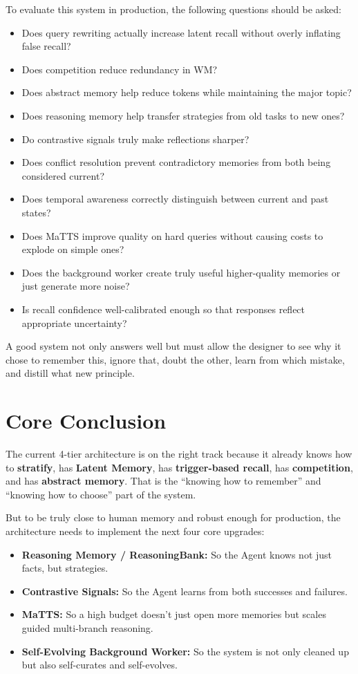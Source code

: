 \documentclass[a4paper,12pt]{article}
\begin{document}
To evaluate this system in production, the following questions should be asked:
\begin{itemize}
    \item Does query rewriting actually increase latent recall without overly inflating false recall?
    \item Does competition reduce redundancy in WM?
    \item Does abstract memory help reduce tokens while maintaining the major topic?
    \item Does reasoning memory help transfer strategies from old tasks to new ones?
    \item Do contrastive signals truly make reflections sharper?
    \item Does conflict resolution prevent contradictory memories from both being considered current?
    \item Does temporal awareness correctly distinguish between current and past states?
    \item Does MaTTS improve quality on hard queries without causing costs to explode on simple ones?
    \item Does the background worker create truly useful higher-quality memories or just generate more noise?
    \item Is recall confidence well-calibrated enough so that responses reflect appropriate uncertainty?
\end{itemize}

A good system not only answers well but must allow the designer to see why it chose to remember this, ignore that, doubt the other, learn from which mistake, and distill what new principle.

\section{Core Conclusion}

The current 4-tier architecture is on the right track because it already knows how to \textbf{stratify}, has \textbf{Latent Memory}, has \textbf{trigger-based recall}, has \textbf{competition}, and has \textbf{abstract memory}. That is the ``knowing how to remember'' and ``knowing how to choose'' part of the system.

But to be truly close to human memory and robust enough for production, the architecture needs to implement the next four core upgrades:
\begin{itemize}
    \item \textbf{Reasoning Memory / ReasoningBank:} So the Agent knows not just facts, but strategies.
    \item \textbf{Contrastive Signals:} So the Agent learns from both successes and failures.
    \item \textbf{MaTTS:} So a high budget doesn't just open more memories but scales guided multi-branch reasoning.
    \item \textbf{Self-Evolving Background Worker:} So the system is not only cleaned up but also self-curates and self-evolves.
\end{itemize}
\end{document}
